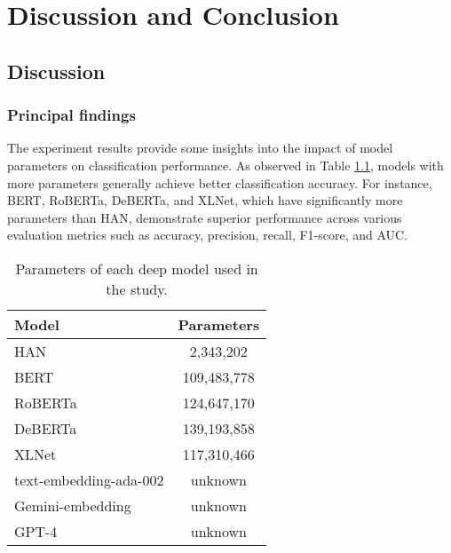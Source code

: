 \chapter{Discussion and Conclusion}
\label{ch:evaluation}
\section{Discussion}
\subsection{Principal findings}
The experiment results provide some insights into the impact of model parameters on classification performance. As observed in Table \ref{tab:parameters}, models with more parameters generally achieve better classification accuracy. For instance, BERT, RoBERTa, DeBERTa, and XLNet, which have significantly more parameters than HAN, demonstrate superior performance across various evaluation metrics such as accuracy, precision, recall, F1-score, and AUC. \\

\begin{table}[]
    \caption{Parameters of each deep model used in the study.}
    \label{tab:parameters}
    \centering
\begin{tabular}{lc}
\hline
Model                                         & \multicolumn{1}{l}{Parameters} \\ \hline
HAN                                           & 2,343,202                      \\
BERT                                          & 109,483,778                    \\
RoBERTa                                       & 124,647,170                    \\
DeBERTa                                       & 139,193,858                    \\
XLNet                                         & 117,310,466                    \\
{\color[HTML]{666666} text-embedding-ada-002}    & {\color[HTML]{666666} unknown} \\
{\color[HTML]{666666} Gemini-embedding} & {\color[HTML]{666666} unknown} \\
{\color[HTML]{666666} GPT-4}                  & {\color[HTML]{666666} unknown} \\ \hline
\end{tabular}
\end{table}


